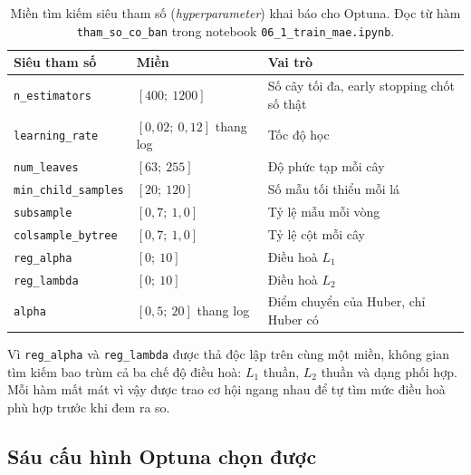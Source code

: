\documentclass[12pt, a4paper]{report}
\begin{document}
\begin{table}[htbp]
\centering
\caption{Miền tìm kiếm siêu tham số khai báo cho Optuna. Đọc từ hàm \texttt{tham\_so\_co\_ban} trong
notebook \texttt{06\_1\_train\_mae.ipynb}.}
\label{tab:mien_optuna}
\small
\begin{tabular}{l l l}
\toprule
\textbf{Siêu tham số} & \textbf{Miền} & \textbf{Vai trò} \\
\midrule
\texttt{n\_estimators}     & $[400;\ 1200]$ & Số cây tối đa, early stopping chốt số thật \\
\texttt{learning\_rate}    & $[0{,}02;\ 0{,}12]$ thang log & Tốc độ học \\
\texttt{num\_leaves}       & $[63;\ 255]$ & Độ phức tạp mỗi cây \\
\texttt{min\_child\_samples} & $[20;\ 120]$ & Số mẫu tối thiểu mỗi lá \\
\texttt{subsample}         & $[0{,}7;\ 1{,}0]$ & Tỷ lệ mẫu mỗi vòng \\
\texttt{colsample\_bytree} & $[0{,}7;\ 1{,}0]$ & Tỷ lệ cột mỗi cây \\
\texttt{reg\_alpha}        & $[0;\ 10]$ & Điều hoà $L_1$ \\
\texttt{reg\_lambda}       & $[0;\ 10]$ & Điều hoà $L_2$ \\
\texttt{alpha}             & $[0{,}5;\ 20]$ thang log & Điểm chuyển của Huber, chỉ Huber có \\
\bottomrule
\end{tabular}
\caption[Miền tìm kiếm siêu tham số (\textit{hyperparameter}) khai báo cho Optuna]{Miền tìm kiếm siêu tham số (\textit{hyperparameter}) khai báo cho Optuna. Đọc từ hàm \texttt{tham\_so\_co\_ban} trong
notebook \texttt{06\_1\_train\_mae.ipynb}.}
\label{tab:mien_optuna}
\end{table}

Vì \texttt{reg\_alpha} và \texttt{reg\_lambda} được thả độc lập trên cùng một miền, không gian
tìm kiếm bao trùm cả ba chế độ điều hoà: $L_1$ thuần, $L_2$ thuần và dạng phối hợp. Mỗi hàm mất
mát vì vậy được trao cơ hội ngang nhau để tự tìm mức điều hoà phù hợp trước khi đem ra so.

\FloatBarrier
\subsection{Sáu cấu hình Optuna chọn được}
\end{document}
